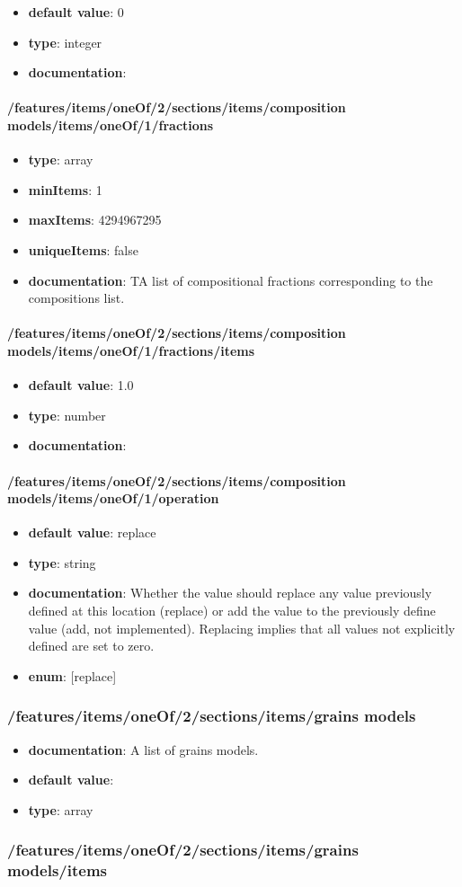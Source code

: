 \begin{itemize}\item {\bf default value}: 0
\item {\bf type}: integer
\item {\bf documentation}: 
\end{itemize}\paragraph{/features/items/oneOf/2/sections/items/composition models/items/oneOf/1/fractions}
\begin{itemize}\item {\bf type}: array
\item {\bf minItems}: 1
\item {\bf maxItems}: 4294967295
\item {\bf uniqueItems}: false
\item {\bf documentation}: TA list of compositional fractions corresponding to the compositions list.
\end{itemize}\paragraph{/features/items/oneOf/2/sections/items/composition models/items/oneOf/1/fractions/items}
\begin{itemize}\item {\bf default value}: 1.0
\item {\bf type}: number
\item {\bf documentation}: 
\end{itemize}\paragraph{/features/items/oneOf/2/sections/items/composition models/items/oneOf/1/operation}
\begin{itemize}\item {\bf default value}: replace
\item {\bf type}: string
\item {\bf documentation}: Whether the value should replace any value previously defined at this location (replace) or add the value to the previously define value (add, not implemented). Replacing implies that all values not explicitly defined are set to zero.
\item {\bf enum}: [replace]\end{itemize}\subsubsection{/features/items/oneOf/2/sections/items/grains models}
\begin{itemize}\item {\bf documentation}: A list of grains models.
\item {\bf default value}: 
\item {\bf type}: array
\end{itemize}\subsubsection{/features/items/oneOf/2/sections/items/grains models/items}


